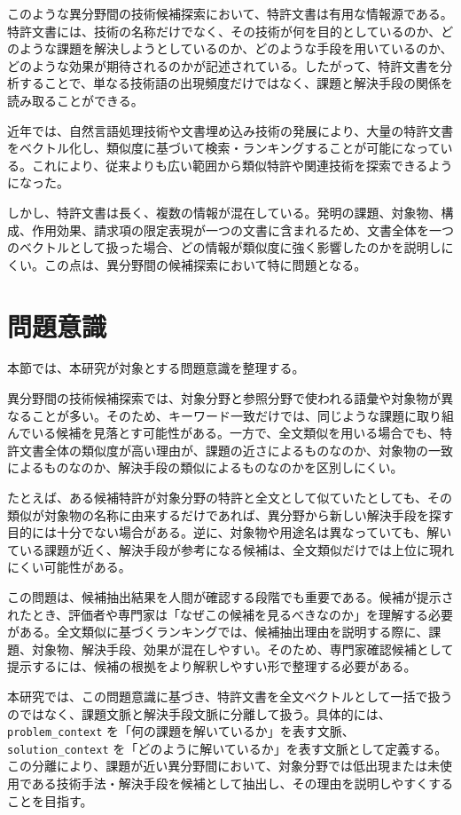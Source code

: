 このような異分野間の技術候補探索において、特許文書は有用な情報源である。特許文書には、技術の名称だけでなく、その技術が何を目的としているのか、どのような課題を解決しようとしているのか、どのような手段を用いているのか、どのような効果が期待されるのかが記述されている。したがって、特許文書を分析することで、単なる技術語の出現頻度だけではなく、課題と解決手段の関係を読み取ることができる。

近年では、自然言語処理技術や文書埋め込み技術の発展により、大量の特許文書をベクトル化し、類似度に基づいて検索・ランキングすることが可能になっている。これにより、従来よりも広い範囲から類似特許や関連技術を探索できるようになった。

しかし、特許文書は長く、複数の情報が混在している。発明の課題、対象物、構成、作用効果、請求項の限定表現が一つの文書に含まれるため、文書全体を一つのベクトルとして扱った場合、どの情報が類似度に強く影響したのかを説明しにくい。この点は、異分野間の候補探索において特に問題となる。

\section{問題意識}

本節では、本研究が対象とする問題意識を整理する。

異分野間の技術候補探索では、対象分野と参照分野で使われる語彙や対象物が異なることが多い。そのため、キーワード一致だけでは、同じような課題に取り組んでいる候補を見落とす可能性がある。一方で、全文類似を用いる場合でも、特許文書全体の類似度が高い理由が、課題の近さによるものなのか、対象物の一致によるものなのか、解決手段の類似によるものなのかを区別しにくい。

たとえば、ある候補特許が対象分野の特許と全文として似ていたとしても、その類似が対象物の名称に由来するだけであれば、異分野から新しい解決手段を探す目的には十分でない場合がある。逆に、対象物や用途名は異なっていても、解いている課題が近く、解決手段が参考になる候補は、全文類似だけでは上位に現れにくい可能性がある。

この問題は、候補抽出結果を人間が確認する段階でも重要である。候補が提示されたとき、評価者や専門家は「なぜこの候補を見るべきなのか」を理解する必要がある。全文類似に基づくランキングでは、候補抽出理由を説明する際に、課題、対象物、解決手段、効果が混在しやすい。そのため、専門家確認候補として提示するには、候補の根拠をより解釈しやすい形で整理する必要がある。

本研究では、この問題意識に基づき、特許文書を全文ベクトルとして一括で扱うのではなく、課題文脈と解決手段文脈に分離して扱う。具体的には、\texttt{problem\_context} を「何の課題を解いているか」を表す文脈、\texttt{solution\_context} を「どのように解いているか」を表す文脈として定義する。この分離により、課題が近い異分野間において、対象分野では低出現または未使用である技術手法・解決手段を候補として抽出し、その理由を説明しやすくすることを目指す。

